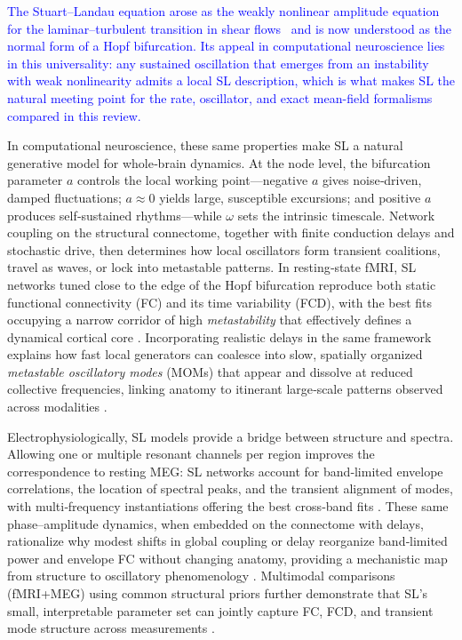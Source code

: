 \documentclass[12pt]{article}
\numberwithin{equation}{section}
\newcommand{\rev}[1]{\textcolor{blue}{#1}}
\begin{document}
\rev{The Stuart--Landau equation arose as the weakly nonlinear amplitude equation for the laminar--turbulent transition in shear flows~\cite{Landau1944,Stuart1958,Stuart1960} and is now understood as the normal form of a Hopf bifurcation. Its appeal in computational neuroscience lies in this universality: any sustained oscillation that emerges from an instability with weak nonlinearity admits a local SL description, which is what makes SL the natural meeting point for the rate, oscillator, and exact mean-field formalisms compared in this review.}

In computational neuroscience, these same properties make SL a natural generative model for whole‑brain dynamics. At the node level, the bifurcation parameter $a$ controls the local working point—negative $a$ gives noise‑driven, damped fluctuations; $a\approx 0$ yields large, susceptible excursions; and positive $a$ produces self‑sustained rhythms—while $\omega$ sets the intrinsic timescale. Network coupling on the structural connectome, together with finite conduction delays and stochastic drive, then determines how local oscillators form transient coalitions, travel as waves, or lock into metastable patterns. In resting‑state fMRI, SL networks tuned close to the edge of the Hopf bifurcation reproduce both static functional connectivity (FC) and its time variability (FCD), with the best fits occupying a narrow corridor of high \emph{metastability} that effectively defines a dynamical cortical core \cite{Deco2017Metastability}. Incorporating realistic delays in the same framework explains how fast local generators can coalesce into slow, spatially organized \emph{metastable oscillatory modes} (MOMs) that appear and dissolve at reduced collective frequencies, linking anatomy to itinerant large‑scale patterns observed across modalities \cite{Cabral2022MOMs}.

Electrophysiologically, SL models provide a bridge between structure and spectra. Allowing one or multiple resonant channels per region improves the correspondence to resting MEG: SL networks account for band‑limited envelope correlations, the location of spectral peaks, and the transient alignment of modes, with multi‑frequency instantiations offering the best cross‑band fits \cite{Deco2017MEG}. These same phase–amplitude dynamics, when embedded on the connectome with delays, rationalize why modest shifts in global coupling or delay reorganize band‑limited power and envelope FC without changing anatomy, providing a mechanistic map from structure to oscillatory phenomenology \cite{Cabral2022MOMs}. Multimodal comparisons (fMRI+MEG) using common structural priors further demonstrate that SL’s small, interpretable parameter set can jointly capture FC, FCD, and transient mode structure across measurements \cite{castaldo2023multi}.
\end{document}
